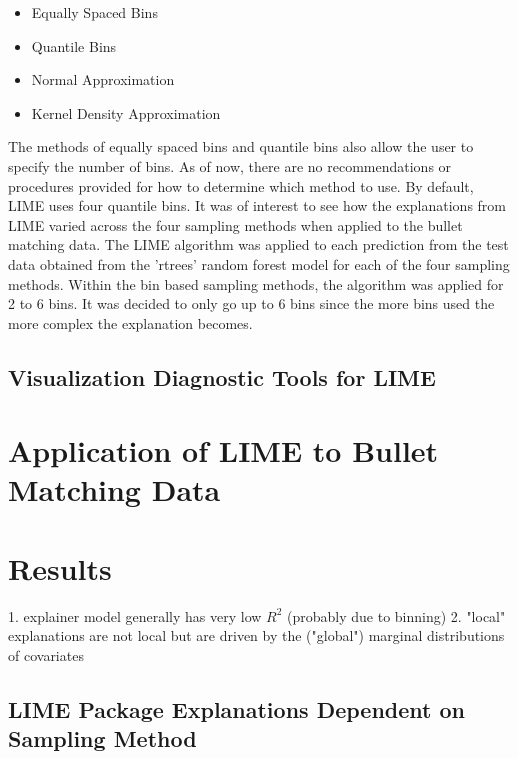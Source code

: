 \documentclass[AMS,STIX2COL]{WileyNJD-v2}\usepackage[]{graphicx}\usepackage[]{color}
\begin{document}
\begin{itemize}
\item Equally Spaced Bins
\item Quantile Bins
\item Normal Approximation
\item Kernel Density Approximation
\end{itemize}

The methods of equally spaced bins and quantile bins also allow the user to specify the number of bins. As of now, there are no recommendations or procedures provided for how to determine which method to use. By default, LIME uses four quantile bins. It was of interest to see how the explanations from LIME varied across the four sampling methods when applied to the bullet matching data. The LIME algorithm was applied to each prediction from the test data obtained from the 'rtrees' random forest model for each of the four sampling methods. Within the bin based sampling methods, the algorithm was applied for 2 to 6 bins. It was decided to only go up to 6 bins since the more bins used the more complex the explanation becomes.

\subsection{Visualization Diagnostic Tools for LIME}

\section{Application of LIME to Bullet Matching Data}

\section{Results}

1. explainer model generally has very low $R^2$ (probably due to binning)
2. "local" explanations are not local but are driven by the ("global") marginal distributions of covariates

\subsection{LIME Package Explanations Dependent on Sampling Method}
\end{document}
